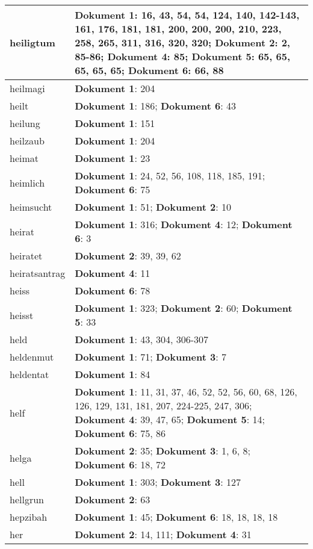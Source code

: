 \documentclass[a5paper]{article}
\begin{document}
\begin{longtable}[l]{|l|p{3in}|}
\hline
heiligtum & \textbf{Dokument 1}: 16, 43, 54, 54, 124, 140, 142-143, 161, 176, 181, 181, 200, 200, 200, 210, 223, 258, 265, 311, 316, 320, 320; \textbf{Dokument 2}: 2, 85-86; \textbf{Dokument 4}: 85; \textbf{Dokument 5}: 65, 65, 65, 65, 65; \textbf{Dokument 6}: 66, 88 \\
\hline
heilmagi & \textbf{Dokument 1}: 204 \\
\hline
heilt & \textbf{Dokument 1}: 186; \textbf{Dokument 6}: 43 \\
\hline
heilung & \textbf{Dokument 1}: 151 \\
\hline
heilzaub & \textbf{Dokument 1}: 204 \\
\hline
heimat & \textbf{Dokument 1}: 23 \\
\hline
heimlich & \textbf{Dokument 1}: 24, 52, 56, 108, 118, 185, 191; \textbf{Dokument 6}: 75 \\
\hline
heimsucht & \textbf{Dokument 1}: 51; \textbf{Dokument 2}: 10 \\
\hline
heirat & \textbf{Dokument 1}: 316; \textbf{Dokument 4}: 12; \textbf{Dokument 6}: 3 \\
\hline
heiratet & \textbf{Dokument 2}: 39, 39, 62 \\
\hline
heiratsantrag & \textbf{Dokument 4}: 11 \\
\hline
heiss & \textbf{Dokument 6}: 78 \\
\hline
heisst & \textbf{Dokument 1}: 323; \textbf{Dokument 2}: 60; \textbf{Dokument 5}: 33 \\
\hline
held & \textbf{Dokument 1}: 43, 304, 306-307 \\
\hline
heldenmut & \textbf{Dokument 1}: 71; \textbf{Dokument 3}: 7 \\
\hline
heldentat & \textbf{Dokument 1}: 84 \\
\hline
helf & \textbf{Dokument 1}: 11, 31, 37, 46, 52, 52, 56, 60, 68, 126, 126, 129, 131, 181, 207, 224-225, 247, 306; \textbf{Dokument 4}: 39, 47, 65; \textbf{Dokument 5}: 14; \textbf{Dokument 6}: 75, 86 \\
\hline
helga & \textbf{Dokument 2}: 35; \textbf{Dokument 3}: 1, 6, 8; \textbf{Dokument 6}: 18, 72 \\
\hline
hell & \textbf{Dokument 1}: 303; \textbf{Dokument 3}: 127 \\
\hline
hellgrun & \textbf{Dokument 2}: 63 \\
\hline
hepzibah & \textbf{Dokument 1}: 45; \textbf{Dokument 6}: 18, 18, 18, 18 \\
\hline
her & \textbf{Dokument 2}: 14, 111; \textbf{Dokument 4}: 31 \\

\end{longtable}
\end{document}
